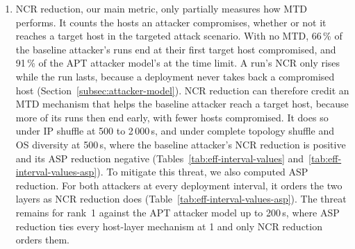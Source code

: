 \documentclass{cshonours}
\begin{document}
\begin{enumerate}[resume*=threats]
\item\label{thr:ncr} NCR reduction, our main metric, only partially
measures how MTD performs. It counts the hosts an attacker compromises,
whether or not it reaches a target host in the targeted attack scenario.
With no MTD, 66\,\% of the baseline attacker's runs end at their first target
host compromised, and 91\,\% of the APT attacker model's at the time limit. A
run's NCR only rises while the run lasts, because a deployment never takes back
a compromised host (Section~\ref{subsec:attacker-model}). NCR reduction can
therefore credit an MTD mechanism that helps the baseline attacker reach a
target host, because more of its runs then end early, with fewer hosts
compromised. It does so under IP shuffle at 500 to 2\,000\,s, and under
complete topology shuffle and OS diversity at 500\,s, where the baseline
attacker's NCR reduction is positive and its ASP reduction negative
(Tables~\ref{tab:eff-interval-values} and~\ref{tab:eff-interval-values-asp}).
To mitigate this threat, we also computed ASP reduction. For both attackers at every deployment
interval, it orders the two layers as NCR reduction does (Table~\ref{tab:eff-interval-values-asp}). The threat remains for rank~1
against the APT attacker model up to 200\,s, where ASP reduction ties every
host-layer mechanism at 1 and only NCR reduction orders them.


\end{enumerate}
\end{document}
